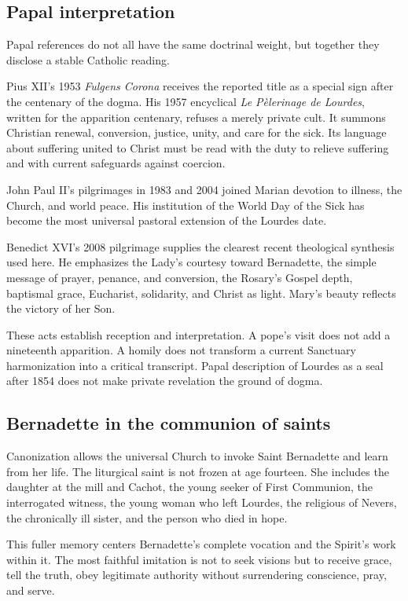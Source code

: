 \subsection{Papal interpretation}

Papal references do not all have the same doctrinal weight, but together they disclose a stable Catholic reading.

Pius XII's 1953 \emph{Fulgens Corona} receives the reported title as a special sign after the centenary of the dogma. His 1957 encyclical \emph{Le Pèlerinage de Lourdes}, written for the apparition centenary, refuses a merely private cult. It summons Christian renewal, conversion, justice, unity, and care for the sick. Its language about suffering united to Christ must be read with the duty to relieve suffering and with current safeguards against coercion.

John Paul II's pilgrimages in 1983 and 2004 joined Marian devotion to illness, the Church, and world peace. His institution of the World Day of the Sick has become the most universal pastoral extension of the Lourdes date.

Benedict XVI's 2008 pilgrimage supplies the clearest recent theological synthesis used here. He emphasizes the Lady's courtesy toward Bernadette, the simple message of prayer, penance, and conversion, the Rosary's Gospel depth, baptismal grace, Eucharist, solidarity, and Christ as light. Mary's beauty reflects the victory of her Son.

These acts establish reception and interpretation. A pope's visit does not add a nineteenth apparition. A homily does not transform a current Sanctuary harmonization into a critical transcript. Papal description of Lourdes as a seal after 1854 does not make private revelation the ground of dogma.

\subsection{Bernadette in the communion of saints}

Canonization allows the universal Church to invoke Saint Bernadette and learn from her life. The liturgical saint is not frozen at age fourteen. She includes the daughter at the mill and Cachot, the young seeker of First Communion, the interrogated witness, the young woman who left Lourdes, the religious of Nevers, the chronically ill sister, and the person who died in hope.

This fuller memory centers Bernadette's complete vocation and the Spirit's work within it. The most faithful imitation is not to seek visions but to receive grace, tell the truth, obey legitimate authority without surrendering conscience, pray, and serve.

